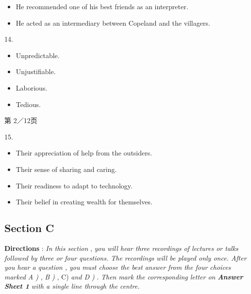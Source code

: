 \documentclass[UTF8,11pt]{ctexart}
\begin{document}
\begin{itemize}[leftmargin=2em,itemsep=.2em,topsep=.4em]\item[C.] He recommended one of his best friends as an interpreter.
\end{itemize}

\begin{itemize}[leftmargin=2em,itemsep=.2em,topsep=.4em]\item[D.] He acted as an intermediary between Copeland and the villagers.
\end{itemize}

14.


\begin{itemize}[leftmargin=2em,itemsep=.2em,topsep=.4em]\item[A.] Unpredictable.
\item[B.] Unjustifiable.
\item[C.] Laborious.
\item[D.] Tedious.
\end{itemize}

第 2／12页


15.


\begin{itemize}[leftmargin=2em,itemsep=.2em,topsep=.4em]\item[A.] Their appreciation of help from the outsiders.
\end{itemize}

\begin{itemize}[leftmargin=2em,itemsep=.2em,topsep=.4em]\item[B.] Their sense of sharing and caring.
\end{itemize}

\begin{itemize}[leftmargin=2em,itemsep=.2em,topsep=.4em]\item[C.] Their readiness to adapt to technology.
\end{itemize}

\begin{itemize}[leftmargin=2em,itemsep=.2em,topsep=.4em]\item[D.] Their belief in creating wealth for themselves.
\end{itemize}

\subsection*{\textbf{Section C}}


\textbf{Directions }: \textit{In this section }, \textit{you will hear three recordings of lectures or talks followed by three or} \textit{four questions. The recordings will be played only once. After you hear a question , you} \textit{must choose the best answer from the four choices marked A ) }, \textit{B ) }, C) \textit{and D ) }. \textit{Then} \textit{mark the corresponding letter on }\textbf{\textit{Answer Sheet 1 }}\textit{with a single line through the} \textit{centre.}
\end{document}
